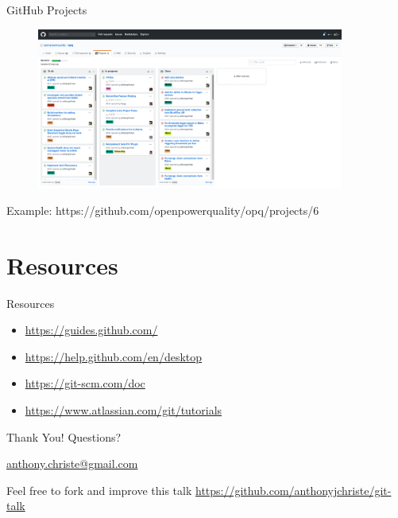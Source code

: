 \documentclass{beamer}
\begin{document}
    \begin{frame}{GitHub Projects}
        \begin{figure}
            \centering
            \includegraphics[width=0.9\textwidth]{figures/github_project.png}
        \end{figure}
        \centering
        Example: https://github.com/openpowerquality/opq/projects/6
    \end{frame}

    \section{Resources}\label{sec:resources}
    \begin{frame}{Resources}
        \begin{itemize}
            \item \url{https://guides.github.com/}
            \item \url{https://help.github.com/en/desktop}
            \item \url{https://git-scm.com/doc}
            \item \url{https://www.atlassian.com/git/tutorials}
        \end{itemize}
    \end{frame}

    \begin{frame}{Thank You!}
        \centering
        Questions?

        \href{mailto:anthony.christe@gmail.com}{anthony.christe@gmail.com}

        Feel free to fork and improve this talk \url{https://github.com/anthonyjchriste/git-talk}
    \end{frame}
\end{document}
